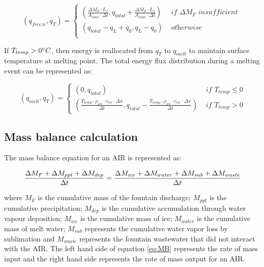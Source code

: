 \begin{equation}
	(q_{freeze}, q_{T}) = \left\{ \begin{array}{ll}
		(\frac{\Delta M_{F} \cdot L_f
		}{A_{cone} \cdot \Delta t}
		, q_{total}+\frac{\Delta M_{F} \cdot L_f
		}{A_{cone} \cdot \Delta t})          & \textit{ if  } \Delta M_{F} \textit{ insufficient } \\
		(q_{total}-q_{L}+q_{0}, q_{L}-q_{0}) & \textit{ otherwise }                                \\
	\end{array} \right.
\end{equation}

If $T_{temp} > 0 ^{\circ} C$, then energy is reallocated from $q_{T}$ to $q_{melt}$ to maintain surface
temperature at melting point. The total energy flux distribution during a melting event can be represented as:

\begin{equation}
	(q_{melt}, q_{T}) = \left\{ \begin{array}{ll}
		(0, q_{total})
		                                                                                                                                                               & \textit{ if } T_{temp} \leq 0 \\
		(\frac{T_{temp} \cdot \rho_{ice} \cdot c_{ice} \cdot \Delta x}{\Delta t}, q_{total}-\frac{T_{temp} \cdot \rho_{ice} \cdot c_{ice} \cdot \Delta x}{\Delta t}  ) & \textit{ if } T_{temp} > 0
	\end{array} \right.
\end{equation}


\subsection{Mass balance calculation}

The mass balance equation for an AIR is represented as:

\begin{equation}
	\frac{\Delta M_{F} + \Delta M_{ppt} + \Delta M_{dep}}{\Delta t} = \frac{\Delta M_{ice} +\Delta M_{water} +
		\Delta M_{sub} + \Delta M_{waste}}{\Delta t}  \\
	\label{eq:MB}
\end{equation}

where $M_{F}$ is the cumulative mass of the fountain discharge; $M_{ppt}$ is the cumulative precipitation;  $M_{dep}$ is the cumulative
accumulation through water vapour deposition; $M_{ice}$ is the cumulative mass of ice; $M_{water}$ is the cumulative
mass of melt water; $M_{sub}$ represents the cumulative water vapor loss by sublimation and $M_{waste}$ represents the
fountain wastewater that did not interact with the AIR. The left hand side of equation \ref{eq:MB} represents the rate of
mass input and the right hand side represents the rate of mass output for an AIR.

